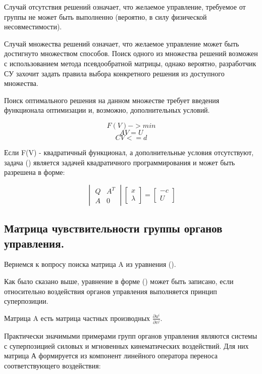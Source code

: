 \documentclass[a4paper]{article}
\begin{document}
Случай отсутствия решений означает, что желаемое управление, требуемое от группы не может быть выполненно (вероятно, в силу физической несовместимости). 

Случай множества решений означает, что желаемое управление может быть достигнуто множеством способов. 
Поиск одного из множества решений возможен с использованием метода псевдообратной матрицы, однако вероятно, разработчик СУ захочит задать правила выбора конкретного решения из доступного множества.

Поиск оптимального решения на данном множестве требует введения функционала оптимизации и, возможно, дополнительных условий.

\begin{equation}F(V) -> min\end{equation}
\begin{equation}AV = U\end{equation}
\begin{equation}CV <= d\end{equation}

Если F(V) - квадратичный функционал, а дополнительные условия отсутствуют, задача () является задачей квадратичного программирования и может быть разрешена в форме:

\begin{equation}
\begin{vmatrix}
Q & A^T\\
A & 0
\end{vmatrix}
\begin{bmatrix}
x\\
\lambda
\end{bmatrix}
=
\begin{bmatrix}
-c\\
U
\end{bmatrix}
\end{equation}

\subsection{Матрица чувствительности группы органов управления.}
Вернемся к вопросу поиска матрица A из уравнения ().

Как было сказано выше, уравнение в форме () может быть записано, если относительно воздействия органов управления выполняется принцип суперпозиции. 

Матрица A есть матрица частных производных $\frac{\partial{u^i}}{\partial{v^j}}$.

Практически значимыми примерами групп органов управления являются системы с суперпозицией силовых и мгновенных кинематических воздействий. Для них матрица А формируется из компонент линейного оператора переноса соответствующего воздействия:
\end{document}
